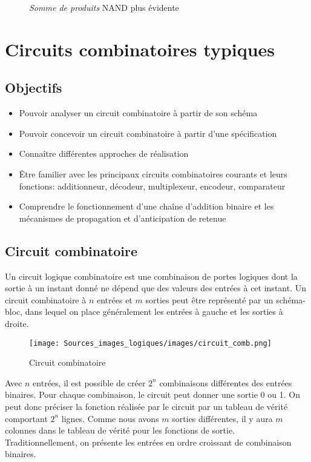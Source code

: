 \documentclass[11pt]{article}
\begin{document}
\begin{figure}[htbp]
\centering

\caption{\label{fig:org24a0f6d}\emph{Somme de produits} NAND plus évidente}
\end{figure}

\section{Circuits combinatoires typiques}
\label{sec:orgb07a48b}
\subsection{Objectifs}
\label{sec:org8fda2ac}
\begin{itemize}
\item Pouvoir analyser un circuit combinatoire à partir de son schéma
\item Pouvoir concevoir un circuit combinatoire à partir d'une spécification
\item Connaître différentes approches de réalisation
\item Être familier avec les principaux circuits combinatoires courants et
leurs fonctions: additionneur, décodeur, multiplexeur, encodeur,
comparateur
\item Comprendre le fonctionnement d'une chaîne d'addition binaire et les
mécanismes de propagation et d'anticipation de retenue
\end{itemize}

\subsection{Circuit combinatoire}
\label{sec:orgb7d965a}

Un circuit logique combinatoire est une combinaison de portes logiques
dont la sortie à un instant donné ne dépend que des valeurs des
entrées à cet instant. Un circuit combinatoire à \(n\) entrées et
\(m\) sorties peut être représenté par un schéma-bloc, dans lequel on
place généralement les entrées à gauche et les sorties à droite.

\begin{figure}[htbp]
\centering
\texttt{[image: Sources\_images\_logiques/images/circuit\_comb.png]}
\caption{\label{fig:org2024b21}Circuit combinatoire}
\end{figure}

Avec \(n\) entrées, il est possible de créer \(2^n\) combinaisons
différentes des entrées binaires. Pour chaque combinaison, le circuit
peut donner une sortie 0 ou 1. On peut donc préciser la fonction
réalisée par le circuit par un tableau de vérité comportant \(2^n\)
lignes. Comme nous avons \(m\) sorties différentes, il y aura \(m\)
colonnes dans le tableau de vérité pour les fonctions de
sortie. Traditionnellement, on présente les entrées en ordre croissant
de combinaison binaires.
\end{document}
